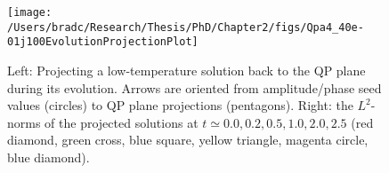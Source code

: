 \documentclass[../PhD.tex]{subfiles}
\begin{document}

\begin{figure}[ht]
	\centering
	\texttt{[image: /Users/bradc/Research/Thesis/PhD/Chapter2/figs/Qpa4\_40e-01j100EvolutionProjectionPlot]}
	\caption[Taking the spectrum of a QP solution during evolution to use as a seed to find new QP solutions]{Left: Projecting a low-temperature solution back to the QP plane during its evolution. Arrows are oriented from amplitude/phase seed values (circles) to QP plane projections (pentagons). Right: the $L^2$-norms of the projected solutions at $t\simeq 0.0, 0.2, 0.5, 1.0, 2.0, 2.5$ (red diamond, green cross, blue square, yellow triangle, magenta circle, blue diamond).}
	\label{fig: Qpa4_40e-01j100EvolutionProjection}
\end{figure}

\end{document}
